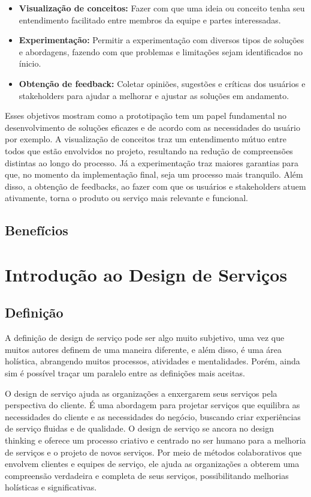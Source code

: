 \begin{itemize}
	\item \textbf{Visualização de conceitos:} Fazer com que uma ideia ou conceito tenha seu entendimento facilitado entre membros da equipe e partes interessadas.
	
	\item \textbf{Experimentação:} Permitir a experimentação com diversos tipos de soluções e abordagens, fazendo com que problemas e limitações sejam identificados no ínicio.
	
	\item \textbf{Obtenção de feedback:} Coletar opiniões, sugestões e críticas dos usuários e stakeholders para ajudar a melhorar e ajustar as soluções em andamento.
\end{itemize}

Esses objetivos mostram como a prototipação tem um papel fundamental no desenvolvimento de soluções eficazes e de acordo com as necessidades do usuário por exemplo. A visualização de conceitos traz um entendimento mútuo entre todos que estão envolvidos no projeto, resultando na redução de compreensões distintas ao longo do processo. Já a experimentação traz maiores garantias para que, no momento da implementação final, seja um processo mais tranquilo. Além disso, a obtenção de feedbacks, ao fazer com que os usuários e stakeholders atuem ativamente, torna o produto ou serviço mais relevante e funcional.

\subsection{Benefícios}

\section{Introdução ao Design de Serviços}

\subsection{Definição}

A definição de design de serviço pode ser algo muito subjetivo, uma vez que muitos autores definem de uma maneira diferente, e além disso, é uma área holística, abrangendo muitos processos, atividades e mentalidades. Porém, ainda sim é possível traçar um paralelo entre as definições mais aceitas.

O design de serviço ajuda as organizações a enxergarem seus serviços pela perspectiva do cliente. É uma abordagem para projetar serviços que equilibra as necessidades do cliente e as necessidades do negócio, buscando criar experiências de serviço fluidas e de qualidade. O design de serviço se ancora no design thinking e oferece um processo criativo e centrado no ser humano para a melhoria de serviços e o projeto de novos serviços. Por meio de métodos colaborativos que envolvem clientes e equipes de serviço, ele ajuda as organizações a obterem uma compreensão verdadeira e completa de seus serviços, possibilitando melhorias holísticas e significativas. \cite{Stickdorn2019}

